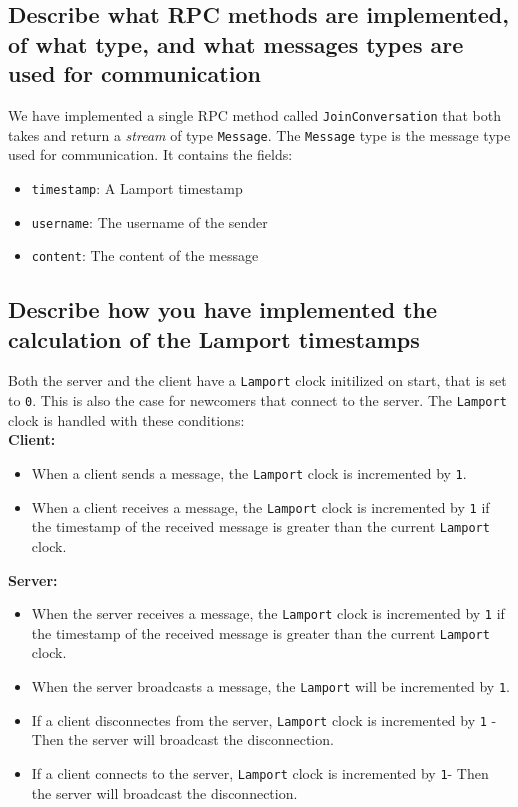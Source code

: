 \documentclass[a4paper,11pt]{article}
\begin{document}
\subsection*{Describe what  RPC methods are implemented, of what type, and what messages types are used for communication}
We have implemented a single RPC method called \verb|JoinConversation| that both takes and return a \textit{stream} of type \verb|Message|.
The \verb|Message| type is the message type used for communication. It contains the fields:
\begin{itemize}
    \item \verb|timestamp|: A Lamport timestamp
    \item \verb|username|: The username of the sender
    \item \verb|content|: The content of the message
\end{itemize} 
\newpage
\subsection*{Describe how you have implemented the calculation of the Lamport timestamps}
Both the server and the client have a \verb|Lamport| clock initilized on start, that is set to \verb|0|. This is also the case for newcomers that connect to the server. 
The \verb|Lamport| clock is handled with these conditions:\\
\textbf{Client:}
\begin{itemize}
    \item When a client sends a message, the \verb|Lamport| clock is incremented by \verb|1|.
    \item When a client receives a message, the \verb|Lamport| clock is incremented by \verb|1| if the timestamp of the received message is greater than the current \verb|Lamport| clock.
\end{itemize}
\textbf{Server:}
\begin{itemize}
    \item When the server receives a message, the \verb|Lamport| clock is incremented by \verb|1| if the timestamp of the received message is greater than the current \verb|Lamport| clock.
    \item When the server broadcasts a message, the \verb|Lamport| will be incremented by \verb|1|.
    \item If a client disconnectes from the server, \verb|Lamport| clock is incremented by \verb|1| - Then the server will broadcast the disconnection.
    \item If a client connects to the server, \verb|Lamport| clock is incremented by \verb|1|- Then the server will broadcast the disconnection.
\end{itemize}
\end{document}
